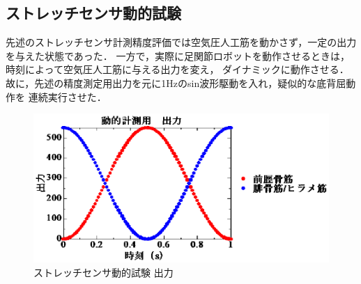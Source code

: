 \subsection{ストレッチセンサ動的試験}
先述のストレッチセンサ計測精度評価では空気圧人工筋を動かさず，一定の出力を与えた状態であった．
一方で，実際に足関節ロボットを動作させるときは，時刻によって空気圧人工筋に与える出力を変え，
ダイナミックに動作させる．故に，先述の精度測定用出力を元に1Hzのsin波形駆動を入れ，疑似的な底背屈動作を
連続実行させた．

\begin{figure}[h]
    \begin{center}
        \includegraphics[width=0.7\columnwidth,clip]{3_analysis/outPut.eps}
        \caption{ストレッチセンサ動的試験 出力}
        \label{output_for_test}
    \end{center}
\end{figure}